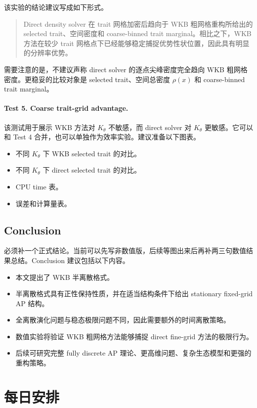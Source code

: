 \documentclass[11pt,a4paper]{ctexart}
\begin{document}
该实验的结论建议写成如下形式。
\begin{quote}
Direct density solver 在 trait 网格加密后趋向于 WKB 粗网格重构所给出的 selected trait、空间密度和 coarse-binned trait marginal。相比之下，WKB 方法在较少 trait 网格点下已经能够稳定捕捉优势性状位置，因此具有明显的分辨率优势。
\end{quote}

需要注意的是，不建议声称 direct solver 的逐点尖峰密度完全趋向 WKB 粗网格密度。更稳妥的比较对象是 selected trait、空间总密度 $\rho(x)$ 和 coarse-binned trait marginal。

\paragraph{Test 5. Coarse trait-grid advantage.}

该测试用于展示 WKB 方法对 $K_\theta$ 不敏感，而 direct solver 对 $K_\theta$ 更敏感。它可以和 Test 4 合并，也可以单独作为效率实验。建议准备以下图表。
\begin{itemize}
    \item 不同 $K_\theta$ 下 WKB selected trait 的对比。
    \item 不同 $K_\theta$ 下 direct selected trait 的对比。
    \item CPU time 表。
    \item 误差和计算量表。
\end{itemize}

\subsection{Conclusion}

必须补一个正式结论。当前可以先写非数值版，后续等图出来后再补两三句数值结果总结。Conclusion 建议包括以下内容。
\begin{itemize}
    \item 本文提出了 WKB 半离散格式。
    \item 半离散格式具有正性保持性质，并在适当结构条件下给出 stationary fixed-grid AP 结构。
    \item 全离散演化问题与稳态极限问题不同，因此需要额外的时间离散策略。
    \item 数值实验将验证 WKB 粗网格方法能够捕捉 direct fine-grid 方法的极限行为。
    \item 后续可研究完整 fully discrete AP 理论、更高维问题、复杂生态模型和更强的重构策略。
\end{itemize}

\section{每日安排}
\end{document}
